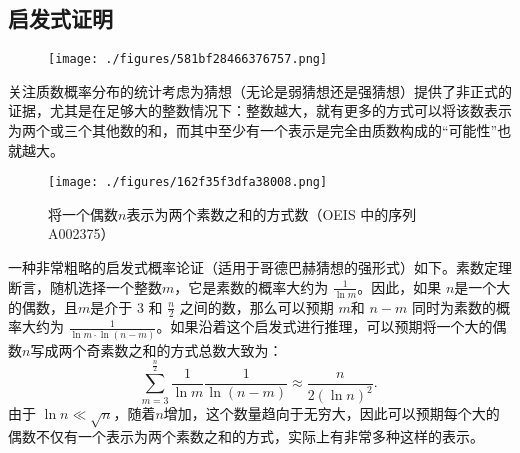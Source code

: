 \subsection{启发式证明}
\begin{figure}[ht]
\centering
\texttt{[image: ./figures/581bf28466376757.png]}
\caption{} \label{fig_GDBHCX_2}
\end{figure}
关注质数概率分布的统计考虑为猜想（无论是弱猜想还是强猜想）提供了非正式的证据，尤其是在足够大的整数情况下：整数越大，就有更多的方式可以将该数表示为两个或三个其他数的和，而其中至少有一个表示是完全由质数构成的“可能性”也就越大。
\begin{figure}[ht]
\centering
\texttt{[image: ./figures/162f35f3dfa38008.png]}
\caption{将一个偶数\(n\)表示为两个素数之和的方式数（OEIS 中的序列 A002375）} \label{fig_GDBHCX_3}
\end{figure}
一种非常粗略的启发式概率论证（适用于哥德巴赫猜想的强形式）如下。素数定理断言，随机选择一个整数\(m\)，它是素数的概率大约为 \( \frac{1}{\ln m} \)。因此，如果 \(n\)是一个大的偶数，且\(m\)是介于 3 和 \( \frac{n}{2} \) 之间的数，那么可以预期 \(m\)和 \( n - m \) 同时为素数的概率大约为 \( \frac{1}{\ln m \cdot \ln(n - m)} \)。如果沿着这个启发式进行推理，可以预期将一个大的偶数\(n\)写成两个奇素数之和的方式总数大致为：
\[
\sum _{m=3}^{\frac {n}{2}}{\frac {1}{\ln m}}{\frac {1}{\ln(n-m)}} \approx \frac{n}{2(\ln n)^{2}}.~
\]
由于 \( \ln n \ll \sqrt{n} \)，随着\(n\)增加，这个数量趋向于无穷大，因此可以预期每个大的偶数不仅有一个表示为两个素数之和的方式，实际上有非常多种这样的表示。

